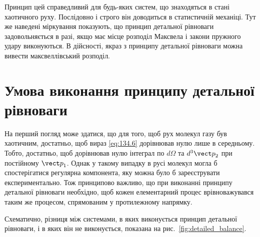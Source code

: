 Принцип цей справедливий для будь-яких систем, що знаходяться в стані хаотичного руху. Послідовно і строго він доводиться в статистичній механіці. Тут же наведені міркування показують, що принцип детальної рівноваги задовольняється в разі, якщо має місце розподіл Максвела і закони пружного удару виконуються. В дійсності, якраз з принципу детальної рівноваги можна вивести максвеллівський розподіл.

\section{Умова виконання принципу детальної рівноваги}

На перший погляд може здатися, що для того, щоб рух молекул газу був хаотичним, достатньо, щоб вираз \eqref{eq:134.6} дорівнював нулю лише в середньому. Тобто, достатньо, щоб дорівнював нулю інтеграл по $d\Omega$ та $d^3{\vect p}_2$ при постійному ${\vect p}_1$. Однак у такому випадку в русі молекул могла б спостерігатися регулярна компонента, яку можна було б зареєструвати експериментально. Тож принципово важливо, що при виконанні принципу детальної рівноваги необхідно, щоб кожен елементарний процес врівноважувався таким же процесом, спрямованим у протилежному напрямку.

Схематично, різниця між системами, в яких виконується принцип детальної рівноваги, і в яких він не виконується, показана на рис.~\ref{fig:detailed_balance}.

